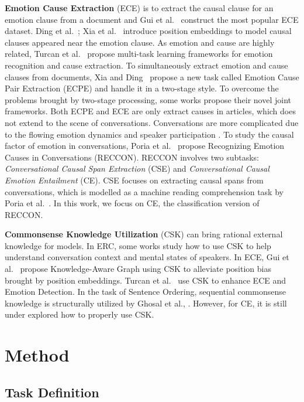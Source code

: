 \documentclass{article}
\begin{document}
\textbf{Emotion Cause Extraction} (ECE) is to extract the causal clause for an emotion clause from a document and Gui et al.~ construct the most popular ECE dataset. Ding et al.~; Xia et al.~ introduce position embeddings to model causal clauses appeared near the emotion clause. As emotion and cause are highly related, Turcan et al.~ propose multi-task learning frameworks for emotion recognition and cause extraction. To simultaneously extract emotion and cause clauses from documents, Xia and Ding~ propose a new task called Emotion Cause Pair Extraction (ECPE) and handle it in a two-stage style. To overcome the problems brought by two-stage processing, some works \cite{ECPE_2D,Rank_Emotion,SlidingWindow} propose their novel joint frameworks. Both ECPE and ECE are only extract causes in articles, which does not extend to the scene of conversations. Conversations are more complicated due to the flowing emotion dynamics and speaker participation \cite{DialogueGCN}. To study the causal factor of emotion in conversations, Poria et al.~ propose Recognizing Emotion Causes in Conversations (RECCON). RECCON involves two subtasks: \textit{Conversational Causal Span Extraction} (CSE) and \textit{Conversational Causal Emotion Entailment} (CE). CSE focuses on extracting causal spans from conversations, which is modelled as a machine reading comprehension task by Poria et al.~. In this work, we focus on CE, the classification version of RECCON. 

\textbf{Commonsense Knowledge Utilization} (CSK) can bring rational external knowledge for models. In ERC, some works \cite{KET,COMSIC,SKAIG} study how to use CSK to help understand conversation context and mental states of speakers. In ECE, Gui et al.~ propose Knowledge-Aware Graph using CSK to alleviate position bias brought by position embeddings. Turcan et al.~ use CSK to enhance ECE and Emotion Detection. In the task of Sentence Ordering, sequential commonsense knowledge is structurally utilized by Ghosal et al., . However, for CE, it is still under explored how to properly use CSK. 

\section{Method}

\subsection{Task Definition}
\end{document}

